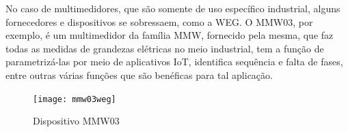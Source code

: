 No caso de multimedidores, que são somente de uso específico industrial, alguns fornecedores e dispositivos se sobressaem, como a WEG. O MMW03, por exemplo, é um multimedidor da família MMW, fornecido pela mesma, que faz todas as medidas de grandezas elétricas no meio industrial, tem a função de parametrizá-las por meio de aplicativos \gls{IoT}, identifica sequência e falta de fases, entre outras várias funções que são benéficas para tal aplicação. 

\begin{figure}[htb]%
    \caption{Dispositivo MMW03}%
    \label{fig:mmw03weg}%
    \texttt{[image: mmw03weg]}%
\end{figure}
